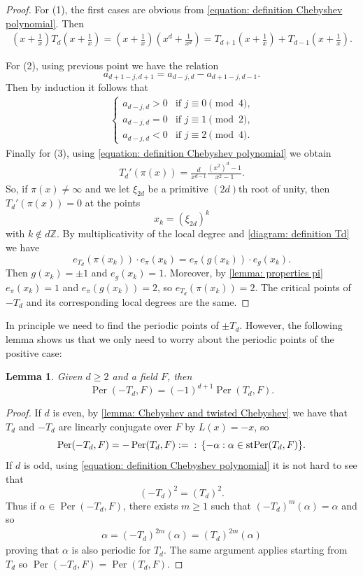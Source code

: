 \documentclass{amsart}
\def\set#1{{\def\st{\;:\;}\left\{#1\right\}}}
\def\ZZ{\mathbb Z}
\DeclareMathOperator{\Per}{Per}
\DeclareMathOperator{\st}{st}
\newtheorem{lemma}[proposition]{Lemma}
\theoremstyle{definition}
\begin{document}
\begin{proof}
For (1), the first cases are obvious from \cref{equation: definition Chebyshev polynomial}. Then 
\begin{align*}
\left( x + \frac{1}{x} \right) T_d\left( x + \frac{1}{x} \right) = \left( x + \frac{1}{x} \right) \left( x^d + \frac{1}{x^d} \right) = T_{d+1}\left( x + \frac{1}{x} \right) + T_{d-1}\left( x + \frac{1}{x} \right).
\end{align*}

For (2), using  previous point we have the relation 
$$a_{d+1-j,d+1} = a_{d-j,d} - a_{d+1-j,d-1}.$$
Then by induction it follows that
\begin{align*}
\left \{ \begin{matrix} 
a_{d-j,d} > 0 & \mbox{if $j \equiv 0 \pmod{4}$,} \\ 
a_{d-j,d} = 0 & \mbox{if $j \equiv 1 \pmod{2}$,} \\
a_{d-j,d} < 0 & \mbox{if $j \equiv 2 \pmod{4}$.} 
\end{matrix}\right.
\end{align*} 
Finally for (3), using \cref{equation: definition Chebyshev polynomial} we obtain 
\begin{align*}
T_d'(\pi(x)) = \frac{d}{x^{d-1}} \frac{(x^2)^d-1}{x^2-1}.
\end{align*}
So, if $\pi(x) \neq \infty$ and we let $\xi_{2d}$ be a primitive $(2d)$th root of unity, then $T_d'(\pi(x)) = 0$ at the points $$x_k = (\xi_{2d})^k$$ with $k \notin d\ZZ$. By multiplicativity of the local degree and \cref{diagram: definition Td} we have $$e_{T_d}(\pi(x_k)) \cdot e_\pi(x_k) = e_\pi(g(x_k)) \cdot e_g(x_k).$$
Then $g(x_k) = \pm 1$ and $e_g(x_k) = 1$. Moreover, by \cref{lemma: properties pi} $e_\pi(x_k) = 1$ and $e_\pi(g(x_k)) = 2$, so $e_{T_d}(\pi(x_k)) = 2$. The critical points of $-T_d$ and its corresponding local degrees are the same.
\end{proof}

In principle we need to find the periodic points of $\pm T_d$. However, the following lemma shows us that we only need to worry about the periodic points of the positive case:

\begin{lemma}
\label{lemma: Per -Td and Per Td}
Given $d \geq 2$ and a field $F$, then 
$$\Per(-T_d, F) =  (-1)^{d+1}\Per(T_d, F).$$ 
\end{lemma}

\begin{proof}
If $d$ is even, by \cref{lemma: Chebyshev and twisted Chebyshev} we have that $T_d$ and $-T_d$ are linearly conjugate over $F$ by $L(x) = -x$, so $$\Per(-T_d, F) =  -\Per(T_d, F) := \set{-\alpha: \alpha \in \Per(T_d, F)}.$$ If $d$ is odd, using \cref{equation: definition Chebyshev polynomial} it is not hard to see that $$(-T_d)^2 = (T_d)^2.$$ Thus if $\alpha \in \Per(-T_d, F)$, there exists $m \geq 1$ such that $(-T_d)^m(\alpha) = \alpha$ and so 
\begin{align*}
\alpha = (-T_d)^{2m}(\alpha) = (T_d)^{2m}(\alpha)
\end{align*}
proving that $\alpha$ is also periodic for $T_d$. The same argument applies starting from $T_d$ so $\Per(-T_d, F) = \Per(T_d, F)$.
\end{proof}
\end{document}
